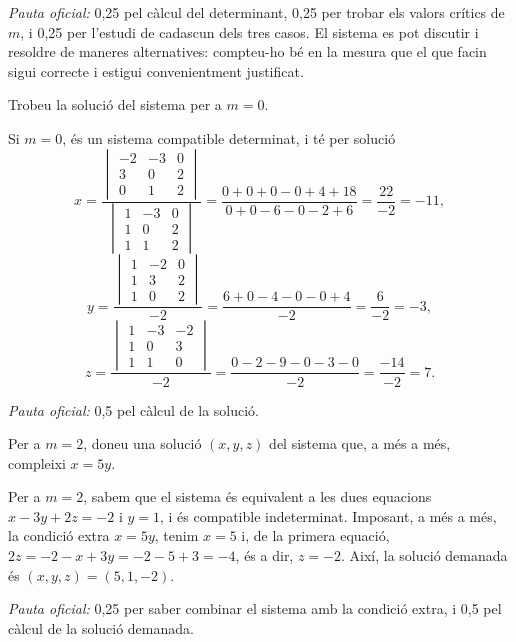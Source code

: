 \begin{apartats}
\begin{solucio}
\textit{Pauta oficial:} 0,25 pel càlcul del determinant, 0,25 per trobar els valors crítics de $m$, i 0,25 per
l'estudi de cadascun dels tres casos. El sistema es pot discutir i resoldre de maneres alternatives: compteu-ho
bé en la mesura que el que facin sigui correcte i estigui convenientment justificat.
\end{solucio}

Trobeu la solució del sistema per a $m=0$.

\begin{solucio}
Si $m=0$, és un sistema compatible determinat, i té per solució
\[
x=\frac{\begin{vmatrix}-2&-3&0\\3&0&2\\0&1&2\end{vmatrix}}{\begin{vmatrix}1&-3&0\\1&0&2\\1&1&2\end{vmatrix}}
=\frac{0+0+0-0+4+18}{0+0-6-0-2+6}=\frac{22}{-2}=-11,
\]
\[
y=\frac{\begin{vmatrix}1&-2&0\\1&3&2\\1&0&2\end{vmatrix}}{-2}=\frac{6+0-4-0-0+4}{-2}=\frac{6}{-2}=-3,
\]
\[
z=\frac{\begin{vmatrix}1&-3&-2\\1&0&3\\1&1&0\end{vmatrix}}{-2}=\frac{0-2-9-0-3-0}{-2}=\frac{-14}{-2}=7 .
\]

\textit{Pauta oficial:} 0,5 pel càlcul de la solució.
\end{solucio}

Per a $m=2$, doneu una solució $(x,y,z)$ del sistema que, a més a més, compleixi $x=5y$.

\begin{solucio}
Per a $m=2$, sabem que el sistema és equivalent a les dues equacions $x-3y+2z=-2$ i $y=1$, i és compatible
indeterminat. Imposant, a més a més, la condició extra $x=5y$, tenim $x=5$ i, de la primera equació,
$2z=-2-x+3y=-2-5+3=-4$, és a dir, $z=-2$. Així, la solució demanada és $(x,y,z)=(5,1,-2)$.

\textit{Pauta oficial:} 0,25 per saber combinar el sistema amb la condició extra, i 0,5 pel càlcul de la
solució demanada.
\end{solucio}

\end{apartats}
